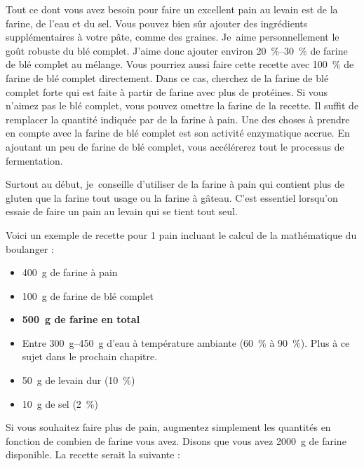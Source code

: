 Tout ce dont vous avez besoin pour faire un excellent pain au levain est de la farine, de l'eau et du sel. Vous pouvez bien sûr ajouter des ingrédients supplémentaires à votre pâte, comme des graines. Je~aime personnellement le goût robuste du blé complet. J'aime donc ajouter environ \qtyrange{20}{30}{\percent} de farine de blé complet au mélange. Vous pourriez aussi faire cette recette avec \qty{100}{\percent} de farine de blé complet directement. Dans ce cas, cherchez de la farine de blé complet forte qui est faite à partir de farine avec plus de protéines. Si vous n'aimez pas le blé complet, vous pouvez omettre la farine de la recette. Il suffit de remplacer la quantité indiquée par de la farine à pain. Une des choses à prendre en compte avec la farine de blé complet est son activité enzymatique accrue. En ajoutant un peu de farine de blé complet, vous accélérerez tout le processus de fermentation.

Surtout au début, je~conseille d'utiliser de la farine à pain qui contient plus de gluten que la farine tout usage ou la farine à gâteau. C'est essentiel lorsqu'on essaie de faire un pain au levain qui se tient tout seul.

Voici un exemple de recette pour 1 pain incluant le calcul de la mathématique du boulanger :

\begin{itemize}
  \item \qty{400}{\gram} de farine à pain
  \item \qty{100}{\gram} de farine de blé complet
  \item \textbf{\qty{500}{\gram} de farine en total}
  \item Entre \qtyrange{300}{450}{\gram} d'eau à température ambiante (\qty{60}{\percent} à \qty{90}{\percent}). Plus à ce sujet dans le prochain chapitre.
  \item \qty{50}{\gram} de levain dur (\qty{10}{\percent})
  \item \qty{10}{\gram} de sel (\qty{2}{\percent})
\end{itemize}

Si vous souhaitez faire plus de pain, augmentez simplement les quantités en fonction de combien de farine vous avez. Disons que vous avez \qty{2000}{\gram} de farine disponible. La recette serait la suivante :

